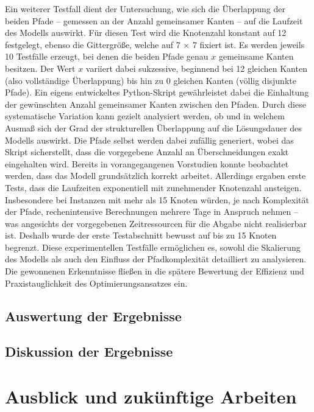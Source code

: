 \documentclass[bachelor, german]{algothesis}
\begin{document}
Ein weiterer Testfall dient der Untersuchung, wie sich die Überlappung der beiden Pfade – gemessen an der Anzahl gemeinsamer Kanten – auf die Laufzeit des Modells auswirkt. Für diesen Test wird die Knotenzahl konstant auf 12 festgelegt, ebenso die Gittergröße, welche auf 7 × 7 fixiert ist. Es werden jeweils 10 Testfälle erzeugt, bei denen die beiden Pfade genau $x$ gemeinsame Kanten besitzen. Der Wert $x$ variiert dabei sukzessive, beginnend bei 12 gleichen Kanten (also vollständige Überlappung) bis hin zu 0 gleichen Kanten (völlig disjunkte Pfade). Ein eigens entwickeltes Python-Skript gewährleistet dabei die Einhaltung der gewünschten Anzahl gemeinsamer Kanten zwischen den Pfaden. Durch diese systematische Variation kann gezielt analysiert werden, ob und in welchem Ausmaß sich der Grad der strukturellen Überlappung auf die Lösungsdauer des Modells auswirkt. Die Pfade selbst werden dabei zufällig generiert, wobei das Skript sicherstellt, dass die vorgegebene Anzahl an Überschneidungen exakt eingehalten wird.
\newline
Bereits in vorangegangenen Vorstudien konnte beobachtet werden, dass das Modell grundsätzlich korrekt arbeitet. Allerdings ergaben erste Tests, dass die Laufzeiten exponentiell mit zunehmender Knotenzahl ansteigen. Insbesondere bei Instanzen mit mehr als 15 Knoten würden, je nach Komplexität der Pfade, rechenintensive Berechnungen mehrere Tage in Anspruch nehmen – was angesichts der vorgegebenen Zeitressourcen für die Abgabe nicht realisierbar ist. Deshalb wurde der erste Testabschnitt bewusst auf bis zu 15 Knoten begrenzt.\newline
Diese experimentellen Testfälle ermöglichen es, sowohl die Skalierung des Modells als auch den Einfluss der Pfadkomplexität detailliert zu analysieren. Die gewonnenen Erkenntnisse fließen in die spätere Bewertung der Effizienz und Praxistauglichkeit des Optimierungsansatzes ein.
\section{Auswertung der Ergebnisse}
\section{Diskussion der Ergebnisse}

\chapter{Ausblick und zukünftige Arbeiten}
\clearpage


\end{document}
